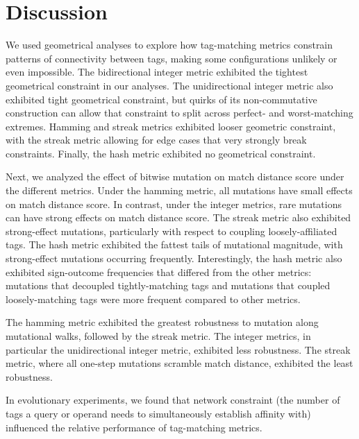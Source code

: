 \section{Discussion}


% 
We used geometrical analyses to explore how tag-matching metrics constrain patterns of connectivity between tags, making some configurations unlikely or even impossible.
The bidirectional integer metric exhibited the tightest geometrical constraint in our analyses.
The unidirectional integer metric also exhibited tight geometrical constraint, but quirks of its non-commutative construction can allow that constraint to split across perfect- and worst-matching extremes.
Hamming and streak metrics exhibited looser geometric constraint, with the streak metric allowing for edge cases that very strongly break constraints.
Finally, the hash metric exhibited no geometrical constraint.

Next, we analyzed the effect of bitwise mutation on match distance score under the different metrics.
Under the hamming metric, all mutations have small effects on match distance score.
In contrast, under the integer metrics, rare mutations can have strong effects on match distance score.
The streak metric also exhibited strong-effect mutations, particularly with respect to coupling loosely-affiliated tags.
The hash metric exhibited the fattest tails of mutational magnitude, with strong-effect mutations occurring frequently.
Interestingly, the hash metric also exhibited sign-outcome frequencies that differed from the other metrics: mutations that decoupled tightly-matching tags and mutations that coupled loosely-matching tags were more frequent compared to other metrics.

The hamming metric exhibited the greatest robustness to mutation along mutational walks, followed by the streak metric.
The integer metrics, in particular the unidirectional integer metric, exhibited less robustness.
The streak metric, where all one-step mutations scramble match distance, exhibited the least robustness.

In evolutionary experiments, we found that network constraint (the number of tags a query or operand needs to simultaneously establish affinity with) influenced the relative performance of tag-matching metrics.

